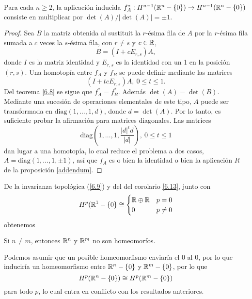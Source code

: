 \documentclass[CV.tex]{subfiles}
\begin{document}
\begin{coro}\label{multiplica}
Para cada $n\geq 2$, la aplicación inducida $f_A^*:H^{n-1}(\mathbb{R}^n-\{0\})\to H^{n-1}(\mathbb{R}^n-\{0\})$ consiste en multiplicar por $\det(A)/|\det(A)|=\pm 1$.
\end{coro}
\begin{proof}
Sea $B$ la matriz obtenida al sustituit la $r$-ésima fila de $A$ por la $r$-ésima fila sumada a $c$ veces la $s$-ésima fila, con $r\neq s$ y $c\in\mathbb{R}$,
\[
B=(I+cE_{r,s})A,
\]
donde $I$ es la matriz identidad y $E_{r,s}$ es la identidad con un 1 en la posición $(r,s)$. Una homotopía entre $f_A$ y $f_B$ se puede definir mediante las matrices
\[
(I+tcE_{r,s})A,\ 0\leq t\leq 1.
\]
Del teorema \ref{6.8} se sigue que $f_A^*=f_B^*$. Además $\det(A)=\det(B)$. Mediante una sucesión de operaciones elementales de este tipo, $A$ puede ser transformada en $\mathrm{diag}(1,\dots, 1,d)$, donde $d=\det(A)$. Por lo tanto, es suficiente probar la afirmación para matrices diagonales. Las matrices
\[
\mathrm{diag}(1,\dots, 1, \frac{|d|^td}{|d|}),\ 0\leq t\leq 1
\]
dan lugar a una homotopía, lo cual reduce el problema a dos casos, $A=\mathrm{diag}(1,\dots, 1,\pm 1)$, así que $f_A$ es o bien la identidad o bien la aplicación $R$ de la proposición \ref{addendum}.
\end{proof}

De la invarianza topológica (\ref{6.9}) y del del corolario \ref{6.13}, junto con 
\[
H^p(\mathbb{R}^1-\{0\}\cong\begin{cases}
\mathbb{R}\oplus\mathbb{R} & p=0\\
0 & p\neq 0
\end{cases}
\]
obtenemos

\begin{prop}
Si $n\neq m$, entonces $\mathbb{R}^n$ y $\mathbb{R}^m$ no son homeomorfos. 
\end{prop}
\begin{dem}
Podemos asumir que un posible homeomorfismo enviaría el 0 al 0, por lo que induciría un homeomorfismo entre $\mathbb{R}^n-\{0\}$ y $\mathbb{R}^m-\{0\}$, por lo que
\[
H^p(\mathbb{R}^n-\{0\})\cong H^p(\mathbb{R}^m-\{0\})
\]
para todo $p$, lo cual entra en conflicto con los resultados anteriores.
\QED
\end{dem}
\end{document}
